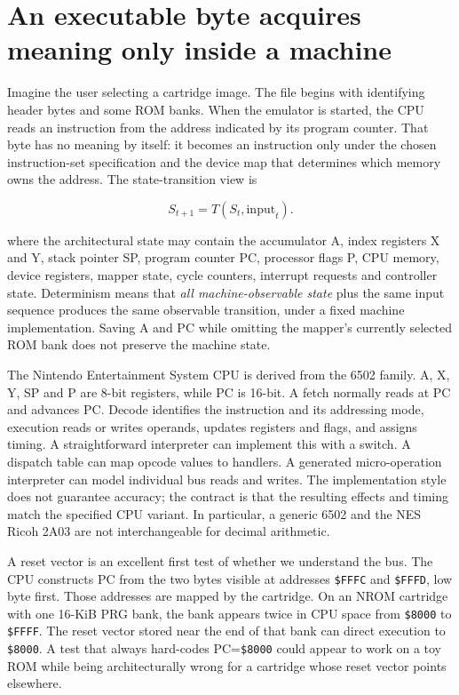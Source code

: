 \section{An executable byte acquires meaning only inside a machine}\label{06-engine-ii-ch042-an-executable-byte-acquires-meaning-only-inside-a-machine}

Imagine the user selecting a cartridge image. The file begins with identifying header bytes and some ROM banks. When the emulator is started, the CPU reads an instruction from the address indicated by its program counter. That byte has no meaning by itself: it becomes an instruction only under the chosen instruction-set specification and the device map that determines which memory owns the address. The state-transition view is

\[
S_{t+1}=T(S_t,\mathrm{input}_t).
\]

where the architectural state may contain the accumulator A, index registers X and Y, stack pointer SP, program counter PC, processor flags P, CPU memory, device registers, mapper state, cycle counters, interrupt requests and controller state. Determinism means that \emph{all machine-observable state} plus the same input sequence produces the same observable transition, under a fixed machine implementation. Saving A and PC while omitting the mapper's currently selected ROM bank does not preserve the machine state.

The Nintendo Entertainment System CPU is derived from the 6502 family. A, X, Y, SP and P are 8-bit registers, while PC is 16-bit. A fetch normally reads at PC and advances PC. Decode identifies the instruction and its addressing mode, execution reads or writes operands, updates registers and flags, and assigns timing. A straightforward interpreter can implement this with a switch. A dispatch table can map opcode values to handlers. A generated micro-operation interpreter can model individual bus reads and writes. The implementation style does not guarantee accuracy; the contract is that the resulting effects and timing match the specified CPU variant. In particular, a generic 6502 and the NES Ricoh 2A03 are not interchangeable for decimal arithmetic.

A reset vector is an excellent first test of whether we understand the bus. The CPU constructs PC from the two bytes visible at addresses \texttt{\$FFFC} and \texttt{\$FFFD}, low byte first. Those addresses are mapped by the cartridge. On an NROM cartridge with one 16-KiB PRG bank, the bank appears twice in CPU space from \texttt{\$8000} to \texttt{\$FFFF}. The reset vector stored near the end of that bank can direct execution to \texttt{\$8000}. A test that always hard-codes PC=\texttt{\$8000} could appear to work on a toy ROM while being architecturally wrong for a cartridge whose reset vector points elsewhere.


